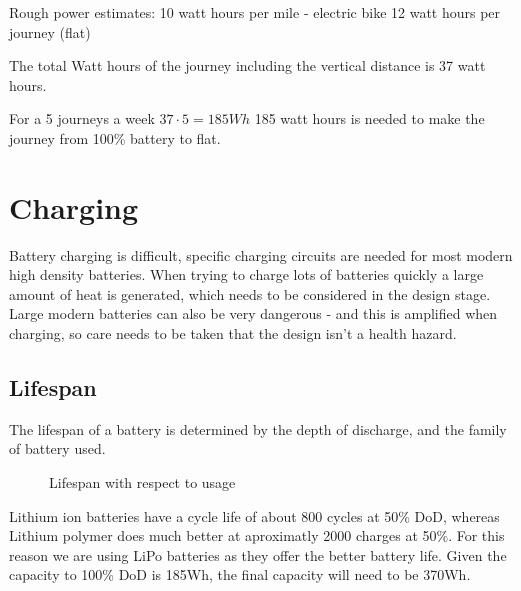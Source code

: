 \documentclass{article}
\begin{document}
Rough power estimates: 
10 watt hours per mile - electric bike
12 watt hours per journey (flat)

The total Watt hours of the journey including the vertical distance is 37 watt hours.

For a 5 journeys a week
$37 \cdot 5 = 185Wh$
185 watt hours is needed to make the journey from 100\% battery to flat.



\section{Charging}
Battery charging is difficult, specific charging circuits are needed for most modern high density batteries.
When trying to charge lots of batteries quickly a large amount of heat is generated, which needs to be considered in the design stage.
Large modern batteries can also be very dangerous - and this is amplified when charging, so care needs to be taken that the design isn't a health hazard.
\subsection{Lifespan}
The lifespan of a battery is determined by the depth of discharge, and the family of battery used.
\begin{figure}[H]
    \centering
    \caption{Lifespan with respect to usage}
    \label{fig:route}
\end{figure}
Lithium ion batteries have a cycle life of about 800 cycles at 50\% DoD, whereas Lithium polymer does much better at aproximatly 2000 charges at 50\%.
For this reason we are using LiPo batteries as they offer the better battery life.
Given the capacity to 100\% DoD is 185Wh, the final capacity will need to be 370Wh.
\end{document}
